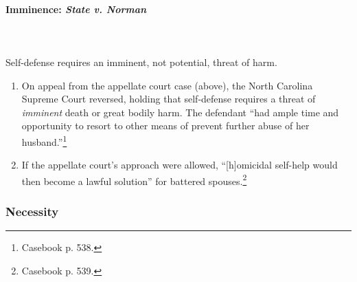 \paragraph{Imminence: \emph{State v. Norman}}
~\\\\
Self-defense requires an imminent, not potential, threat of harm.

\begin{enumerate}
     \item On appeal from the appellate court case (above), the North Carolina 
     Supreme Court reversed, holding that self-defense requires a threat of 
     \emph{imminent} death or great bodily harm. The defendant ``had ample 
     time and opportunity to resort to other means of prevent further abuse of 
     her husband.''\footnote{Casebook p. 538.}
     \item If the appellate court's approach were allowed, ``[h]omicidal 
     self-help would then become a lawful solution'' for battered 
     spouses.\footnote{Casebook p. 539.}
\end{enumerate}

\subsubsection{Necessity}

